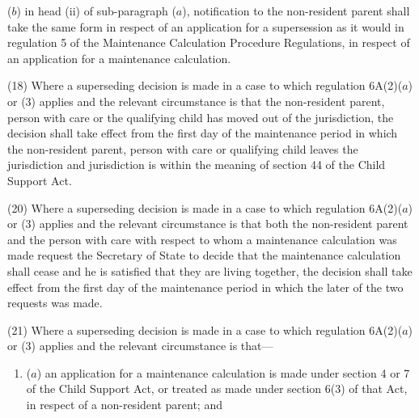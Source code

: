 \documentclass[12pt,a4paper]{article}
\begin{document}
{\begin{enumerate}
($b$) in head (ii)  of sub-paragraph ($a$), notification to the non-resident parent shall take the same form in respect of an application for a supersession as it would in regulation 5 of the Maintenance Calculation Procedure Regulations, in respect of an application for a maintenance calculation.
\end{enumerate}

(18) Where a superseding decision is made in a case to which regulation 6A(2)($a$)  or (3) applies and the relevant circumstance is that the non-resident parent, person with care or the qualifying child has moved out of the jurisdiction, the decision shall take effect from the first day of the maintenance period in which the non-resident parent, person with care or qualifying child leaves the jurisdiction and jurisdiction is within the meaning of section 44 of the Child Support Act.

%

(20) Where a superseding decision is made in a case to which regulation 6A(2)($a$)  or (3) applies and the relevant circumstance is that both the non-resident parent and the person with care with respect to whom a maintenance calculation was made request the Secretary of State to decide that the maintenance calculation shall cease and he is satisfied that they are living together, the decision shall take effect from the first day of the maintenance period in which the later of the two requests was made.

(21) Where a superseding decision is made in a case to which regulation 6A(2)($a$)  or (3) applies and the relevant circumstance is that—
\begin{enumerate}\item[]
($a$) an application for a maintenance calculation is made under section 4 or 7 of the Child Support Act, or treated as made under section 6(3) of that Act, in respect of a non-resident parent; and


\end{enumerate}}
\end{document}
